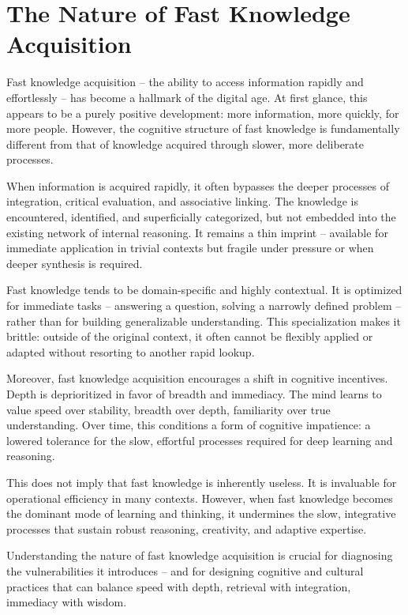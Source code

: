 \section{The Nature of Fast Knowledge Acquisition}

Fast knowledge acquisition -- the ability to access information rapidly
and effortlessly -- has become a hallmark of the digital age. At first
glance, this appears to be a purely positive development: more
information, more quickly, for more people. However, the cognitive
structure of fast knowledge is fundamentally different from that of
knowledge acquired through slower, more deliberate processes.

When information is acquired rapidly, it often bypasses the deeper
processes of integration, critical evaluation, and associative linking.
The knowledge is encountered, identified, and superficially categorized,
but not embedded into the existing network of internal reasoning. It
remains a thin imprint -- available for immediate application in trivial
contexts but fragile under pressure or when deeper synthesis is
required.

Fast knowledge tends to be domain-specific and highly contextual. It is
optimized for immediate tasks -- answering a question, solving a narrowly
defined problem -- rather than for building generalizable understanding.
This specialization makes it brittle: outside of the original context,
it often cannot be flexibly applied or adapted without resorting to
another rapid lookup.

Moreover, fast knowledge acquisition encourages a shift in cognitive
incentives. Depth is deprioritized in favor of breadth and immediacy.
The mind learns to value speed over stability, breadth over depth,
familiarity over true understanding. Over time, this conditions a form
of cognitive impatience: a lowered tolerance for the slow, effortful
processes required for deep learning and reasoning.

This does not imply that fast knowledge is inherently useless. It is
invaluable for operational efficiency in many contexts. However, when
fast knowledge becomes the dominant mode of learning and thinking, it
undermines the slow, integrative processes that sustain robust
reasoning, creativity, and adaptive expertise.

Understanding the nature of fast knowledge acquisition is crucial for
diagnosing the vulnerabilities it introduces -- and for designing
cognitive and cultural practices that can balance speed with depth,
retrieval with integration, immediacy with wisdom.


